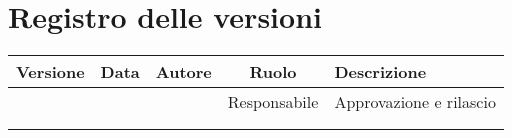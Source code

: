 
\section*{Registro delle versioni}
\begin{table}[H]
    \begin{tabular}{|c|c|c|c|p{5cm}|}
        \hline
         \textbf{Versione} &  \textbf{Data} &  \textbf{Autore} &  \textbf{Ruolo} & \textbf{Descrizione} \\
          \hline
          &  &  & Responsabile & Approvazione e rilascio\\
          \hline
          &  &  &  &  \\
          \hline
          &  &  &  &  \\
          \hline
    \end{tabular}
\end{table}
